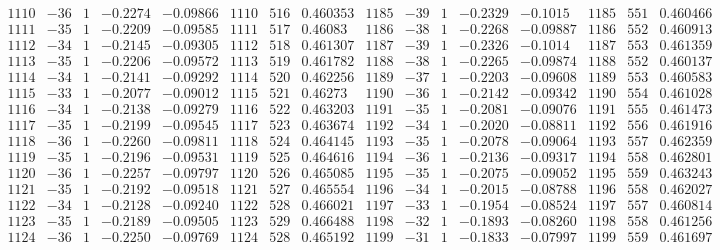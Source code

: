 \documentclass[11pt,reqno,a4letter]{article}
\numberwithin{figure}{section}
\numberwithin{table}{section}
\theoremstyle{plain}
\numberwithin{theorem}{section}
\theoremstyle{definition}
\newcommand{\NBRef}[1]{}
\begin{document}
\begin{table}[ht]
\begin{equation*}
{\begin{array}{ccccc|ccc|ccccc|ccc}
 1110 & -36 & 1 & -0.2274 & -0.09866 & 1110 & 516 & 0.460353 & 1185 & -39 & 1 & -0.2329 & -0.1015 & 1185 & 551 & 0.460466 \\
 1111 & -35 & 1 & -0.2209 & -0.09585 & 1111 & 517 & 0.46083 & 1186 & -38 & 1 & -0.2268 & -0.09887 & 1186 & 552 & 0.460913 \\
 1112 & -34 & 1 & -0.2145 & -0.09305 & 1112 & 518 & 0.461307 & 1187 & -39 & 1 & -0.2326 & -0.1014 & 1187 & 553 & 0.461359 \\
 1113 & -35 & 1 & -0.2206 & -0.09572 & 1113 & 519 & 0.461782 & 1188 & -38 & 1 & -0.2265 & -0.09874 & 1188 & 552 & 0.460137 \\
 1114 & -34 & 1 & -0.2141 & -0.09292 & 1114 & 520 & 0.462256 & 1189 & -37 & 1 & -0.2203 & -0.09608 & 1189 & 553 & 0.460583 \\
 1115 & -33 & 1 & -0.2077 & -0.09012 & 1115 & 521 & 0.46273 & 1190 & -36 & 1 & -0.2142 & -0.09342 & 1190 & 554 & 0.461028 \\
 1116 & -34 & 1 & -0.2138 & -0.09279 & 1116 & 522 & 0.463203 & 1191 & -35 & 1 & -0.2081 & -0.09076 & 1191 & 555 & 0.461473 \\
 1117 & -35 & 1 & -0.2199 & -0.09545 & 1117 & 523 & 0.463674 & 1192 & -34 & 1 & -0.2020 & -0.08811 & 1192 & 556 & 0.461916 \\
 1118 & -36 & 1 & -0.2260 & -0.09811 & 1118 & 524 & 0.464145 & 1193 & -35 & 1 & -0.2078 & -0.09064 & 1193 & 557 & 0.462359 \\
 1119 & -35 & 1 & -0.2196 & -0.09531 & 1119 & 525 & 0.464616 & 1194 & -36 & 1 & -0.2136 & -0.09317 & 1194 & 558 & 0.462801 \\
 1120 & -36 & 1 & -0.2257 & -0.09797 & 1120 & 526 & 0.465085 & 1195 & -35 & 1 & -0.2075 & -0.09052 & 1195 & 559 & 0.463243 \\
 1121 & -35 & 1 & -0.2192 & -0.09518 & 1121 & 527 & 0.465554 & 1196 & -34 & 1 & -0.2015 & -0.08788 & 1196 & 558 & 0.462027 \\
 1122 & -34 & 1 & -0.2128 & -0.09240 & 1122 & 528 & 0.466021 & 1197 & -33 & 1 & -0.1954 & -0.08524 & 1197 & 557 & 0.460814 \\
 1123 & -35 & 1 & -0.2189 & -0.09505 & 1123 & 529 & 0.466488 & 1198 & -32 & 1 & -0.1893 & -0.08260 & 1198 & 558 & 0.461256 \\
 1124 & -36 & 1 & -0.2250 & -0.09769 & 1124 & 528 & 0.465192 & 1199 & -31 & 1 & -0.1833 & -0.07997 & 1199 & 559 & 0.461697 \\
\end{array} 
}
\end{equation*} 
\clearpage 

\end{table} 

\clearpage 

\end{document}
